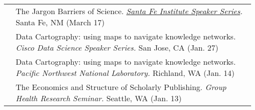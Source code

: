 \documentclass[11pt]{article}
\begin{document}
\begin{longtable}{p{0.5in}|p{5.5in}}
       	& The Jargon Barriers of Science. \textit{\href{http://www.santafe.edu/gevent/?start=2015-03-01}{Santa Fe Institute Speaker Series}.} Santa Fe, NM (March 17) \\

       	& Data Cartography: using maps to navigate knowledge networks. \textit{Cisco Data Science Speaker Series.} San Jose, CA (Jan. 27) \\

       	& Data Cartography: using maps to navigate knowledge networks. \textit{Pacific Northwest National Laboratory.} Richland, WA (Jan. 14) \\

       	& The Economics and Structure of Scholarly Publishing. \textit{Group Health Research Seminar.} Seattle, WA (Jan. 13) \\


\end{longtable}
\end{document}
